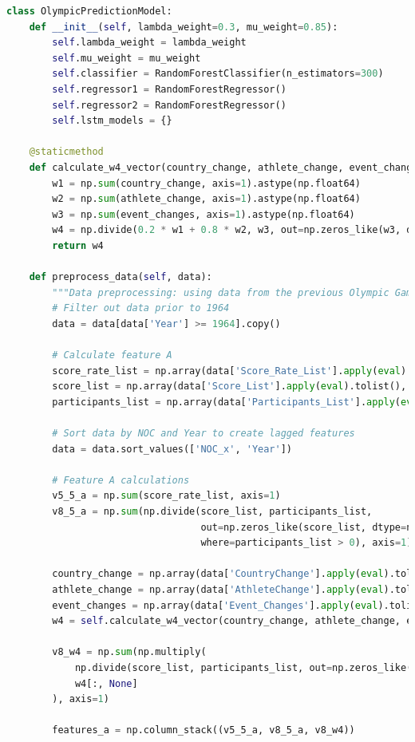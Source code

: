 \documentclass[12pt]{article}
\begin{document}
\begin{lstlisting}[language=Python, style=mystyle, caption=model.ipynb]
class OlympicPredictionModel:
    def __init__(self, lambda_weight=0.3, mu_weight=0.85):
        self.lambda_weight = lambda_weight
        self.mu_weight = mu_weight
        self.classifier = RandomForestClassifier(n_estimators=300)
        self.regressor1 = RandomForestRegressor()
        self.regressor2 = RandomForestRegressor()
        self.lstm_models = {}

    @staticmethod
    def calculate_w4_vector(country_change, athlete_change, event_changes):
        w1 = np.sum(country_change, axis=1).astype(np.float64)
        w2 = np.sum(athlete_change, axis=1).astype(np.float64)
        w3 = np.sum(event_changes, axis=1).astype(np.float64)
        w4 = np.divide(0.2 * w1 + 0.8 * w2, w3, out=np.zeros_like(w3, dtype=np.float64), where=w3 != 0)
        return w4

    def preprocess_data(self, data):
        """Data preprocessing: using data from the previous Olympic Games to predict the current one."""
        # Filter out data prior to 1964
        data = data[data['Year'] >= 1964].copy()
        
        # Calculate feature A
        score_rate_list = np.array(data['Score_Rate_List'].apply(eval).tolist())
        score_list = np.array(data['Score_List'].apply(eval).tolist(), dtype=np.float64)
        participants_list = np.array(data['Participants_List'].apply(eval).tolist(), dtype=np.float64)

        # Sort data by NOC and Year to create lagged features
        data = data.sort_values(['NOC_x', 'Year'])
        
        # Feature A calculations
        v5_5_a = np.sum(score_rate_list, axis=1)
        v8_5_a = np.sum(np.divide(score_list, participants_list, 
                                  out=np.zeros_like(score_list, dtype=np.float64), 
                                  where=participants_list > 0), axis=1)
        
        country_change = np.array(data['CountryChange'].apply(eval).tolist())
        athlete_change = np.array(data['AthleteChange'].apply(eval).tolist())
        event_changes = np.array(data['Event_Changes'].apply(eval).tolist())
        w4 = self.calculate_w4_vector(country_change, athlete_change, event_changes)
        
        v8_w4 = np.sum(np.multiply(
            np.divide(score_list, participants_list, out=np.zeros_like(score_list), where=participants_list > 0),
            w4[:, None]
        ), axis=1)
        
        features_a = np.column_stack((v5_5_a, v8_5_a, v8_w4))
        

\end{lstlisting}
\end{document}

